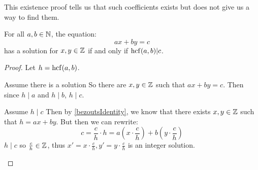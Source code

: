 \documentclass[../main.tex]{subfiles}
\begin{document}
\begin{remark}
  This existence proof tells us that such coefficients exists but does not give us a way to find them.
\end{remark}
\begin{corollary}
  For all $a, b \in \mathbb{N}$, the equation:
  \[
    ax + by = c
  \]
  has a solution for $x, y \in \mathbb{Z}$ if and only if $\operatorname{hcf}(a, b) | c$.
\end{corollary}
\begin{proof}
  Let $h = \operatorname{hcf}(a, b)$.
  \begin{proofdirection}{Assume there is a solution}
    So there are $x, y \in \mathbb{Z}$ such that $ax + by = c$.
    Then since $h \mid a$ and $h \mid b$, $h \mid c$.
  \end{proofdirection}
  \begin{proofdirection}{Assume $h \mid c$}
    Then by \cref{bezoutsIdentity}, we know that there exists $x, y \in \mathbb{Z}$ such that $h = ax + by$.
    But then we can rewrite:
    \[
      c = \frac{c}{h} \cdot h = a \left(x \cdot \frac{c}{h}\right) + b \left(y \cdot \frac{c}{h}\right)
    \]
    $h \mid c$ so $\frac{c}{h} \in \mathbb{Z}$, thus $x' = x \cdot \frac{c}{h}, y' = y \cdot \frac{c}{h}$ is an integer solution.
  \end{proofdirection}
\end{proof}
\end{document}
